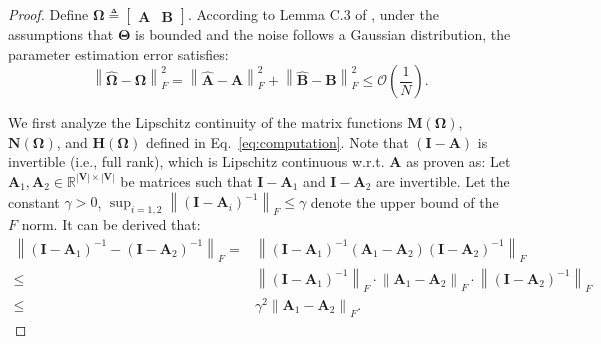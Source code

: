 \documentclass{article}
\theoremstyle{plain}
\theoremstyle{definition}
\theoremstyle{remark}
\def \Eq {Eq.}
\def \V {\mathbf{V}}
\def \N {\mathbf{N}}
\def \I {\mathbf{I}}
\def \M {\mathbf{M}}
\def \H {\mathbf{H}}
\def \A {\mathbf{A}}
\def \V {\mathbf{V}}
\def \B {\mathbf{B}}
\begin{document}
\begin{proof}
  Define $\bm{\Omega} \triangleq \begin{bmatrix} \A & \B \end{bmatrix}$. According to Lemma C.3 of \citet{du2024micns}, under the assumptions that $\bm{\Theta}$ is bounded and the noise follows a Gaussian distribution, the parameter estimation error satisfies:
  $$
  \left\|\hat{\bm{\Omega}} - \bm{\Omega}\right\|_F^2 
  = \left\|\hat{\A} - \A\right\|_F^2 + \left\|\hat{\B} - \B\right\|_F^2 
  \leq  \mathcal{O}\left( \frac{1}{N} \right). 
  $$
  
  We first analyze the Lipschitz continuity of the matrix functions $\M(\bm{\Omega})$, $\N(\bm{\Omega})$, and $\H(\bm{\Omega})$ defined in \Eq~\eqref{eq:computation}. 
  Note that $(\I - \A)$ is invertible (i.e., full rank), which is Lipschitz continuous w.r.t. $\A$ as proven as: 
  Let $\A_1, \A_2 \in \mathbb{R}^{|\V| \times |\V|}$ be matrices such that $\I - \A_1$ and $\I - \A_2$ are invertible. Let the constant $\gamma > 0$, $
\sup_{i=1,2} \left\| (\I - \A_i)^{-1} \right\|_F \leq \gamma
$ denote the upper bound of the \(F\) norm. 
It can be derived that:
\[
\begin{aligned}
  \left\| (\I - \A_1)^{-1} - (\I - \A_2)^{-1}\right\|_F =& \left\| (\I - \A_1)^{-1} (\A_1 - \A_2) (\I - \A_2)^{-1}\right\|_F \\
  \leq & \left\| (\I - \A_1)^{-1} \right\|_F \cdot \left\| \A_1 - \A_2 \right\|_F \cdot \left\| (\I - \A_2)^{-1} \right\|_F \\
  \leq &\gamma^2 \left\| \A_1 - \A_2 \right\|_F.
\end{aligned}
\]


\end{proof}
\end{document}

